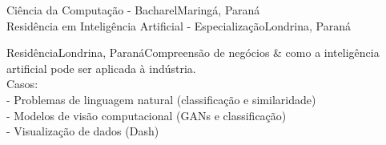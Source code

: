 \documentclass[
    10pt,
    english,
]{article}
\begin{document}
{Ciência da Computação - Bacharel}{Maringá, Paraná}{}
\\
{Residência em Inteligência Artificial - Especialização}{Londrina, Paraná}{}

{Residência}{Londrina, Paraná}{Compreensão de negócios \& como a inteligência artificial pode ser aplicada à indústria. \\ Casos: \\
    \tab - Problemas de linguagem natural (classificação e similaridade) \\
    \tab - Modelos de visão computacional (GANs e classificação) \\
    \tab - Visualização de dados (Dash)}
\end{document}
